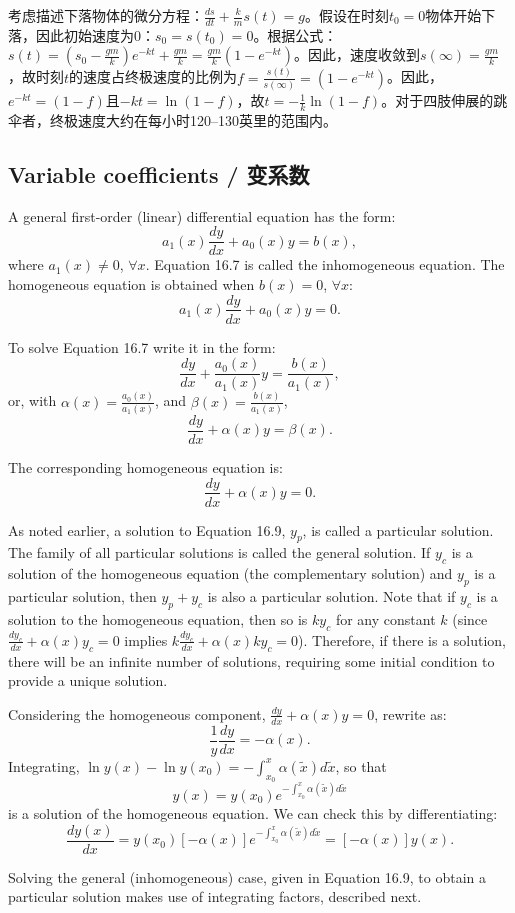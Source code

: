 \begin{translation}
考虑描述下落物体的微分方程：$\frac{ds}{dt} + \frac{k}{m}s(t) = g$。假设在时刻$t_0 = 0$物体开始下落，因此初始速度为$0$：$s_0 = s(t_0) = 0$。根据公式：$s(t) = (s_0 - \frac{gm}{k})e^{-kt} + \frac{gm}{k} = \frac{gm}{k}(1 - e^{-kt})$。因此，速度收敛到$s(\infty) = \frac{gm}{k}$，故时刻$t$的速度占终极速度的比例为$f = \frac{s(t)}{s(\infty)} = (1 - e^{-kt})$。因此，$e^{-kt} = (1 - f)$且$-kt = \ln(1 - f)$，故$t = -\frac{1}{k}\ln(1 - f)$。对于四肢伸展的跳伞者，终极速度大约在每小时120--130英里的范围内。
\end{translation}
\subsection{Variable coefficients / 变系数}

\begin{original}
A general first-order (linear) differential equation has the form:
\[
a_1(x)\frac{dy}{dx} + a_0(x)y = b(x), \tag{16.7}
\]
where $a_1(x) \neq 0$, $\forall x$. Equation 16.7 is called the inhomogeneous equation. The homogeneous equation is obtained when $b(x) = 0$, $\forall x$:
\[
a_1(x)\frac{dy}{dx} + a_0(x)y = 0. \tag{16.8}
\]

To solve Equation 16.7 write it in the form:
\[
\frac{dy}{dx} + \frac{a_0(x)}{a_1(x)}y = \frac{b(x)}{a_1(x)},
\]
or, with $\alpha(x) = \frac{a_0(x)}{a_1(x)}$, and $\beta(x) = \frac{b(x)}{a_1(x)}$,
\[
\frac{dy}{dx} + \alpha(x)y = \beta(x). \tag{16.9}
\]

The corresponding homogeneous equation is:
\[
\frac{dy}{dx} + \alpha(x)y = 0.
\]

As noted earlier, a solution to Equation 16.9, $y_p$, is called a particular solution. The family of all particular solutions is called the general solution. If $y_c$ is a solution of the homogeneous equation (the complementary solution) and $y_p$ is a particular solution, then $y_p + y_c$ is also a particular solution. Note that if $y_c$ is a solution to the homogeneous equation, then so is $k y_c$ for any constant $k$ (since $\frac{dy_c}{dx} + \alpha(x) y_c = 0$ implies $k\frac{dy_c}{dx} + \alpha(x)k y_c = 0$). Therefore, if there is a solution, there will be an infinite number of solutions, requiring some initial condition to provide a unique solution.

Considering the homogeneous component, $\frac{dy}{dx} + \alpha(x)y = 0$, rewrite as:
\[
\frac{1}{y}\frac{dy}{dx} = -\alpha(x).
\]
Integrating, $\ln y(x) - \ln y(x_0) = -\int_{x_0}^{x} \alpha(\tilde{x}) d\tilde{x}$, so that
\[
y(x) = y(x_0)e^{-\int_{x_0}^{x} \alpha(\tilde{x}) d\tilde{x}} \tag{16.10}
\]
is a solution of the homogeneous equation. We can check this by differentiating:
\[
\frac{d y(x)}{dx} = y(x_0)[-\alpha(x)]e^{-\int_{x_0}^{x} \alpha(\tilde{x}) d\tilde{x}} = [-\alpha(x)]y(x).
\]

Solving the general (inhomogeneous) case, given in Equation 16.9, to obtain a particular solution makes use of integrating factors, described next.
\end{original}
